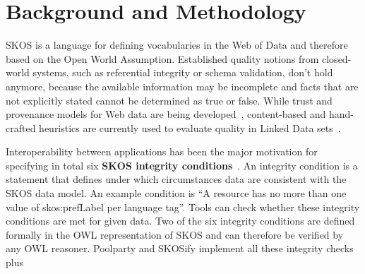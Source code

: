 
\section{Background and Methodology}


SKOS is a language for defining vocabularies in the Web of Data and therefore based on the Open World Assumption. Established quality notions from closed-world systems, such as referential integrity or schema validation, don't hold anymore, because the available information may be incomplete and facts that are not explicitly stated cannot be determined as true or false. While trust and provenance models for Web data are being developed~\cite{Omitola2011,Hartig2009}, content-based and hand-crafted heuristics are currently used to evaluate quality in Linked Data sets~\cite{Heath2011}. 




Interoperability between applications has been the major motivation for specifying in total six \textbf{SKOS integrity conditions}~\cite{Miles2005}. An integrity condition is a statement that defines under which circumstances data are consistent with the SKOS data model. An example condition is ``A resource has no more than one value of skos:prefLabel per language tag''. Tools can check whether these integrity conditions are met for given data. Two of the six integrity conditions are defined formally in the OWL representation of SKOS and can therefore be verified by any OWL reasoner. Poolparty and SKOSify implement all these integrity checks plus 

